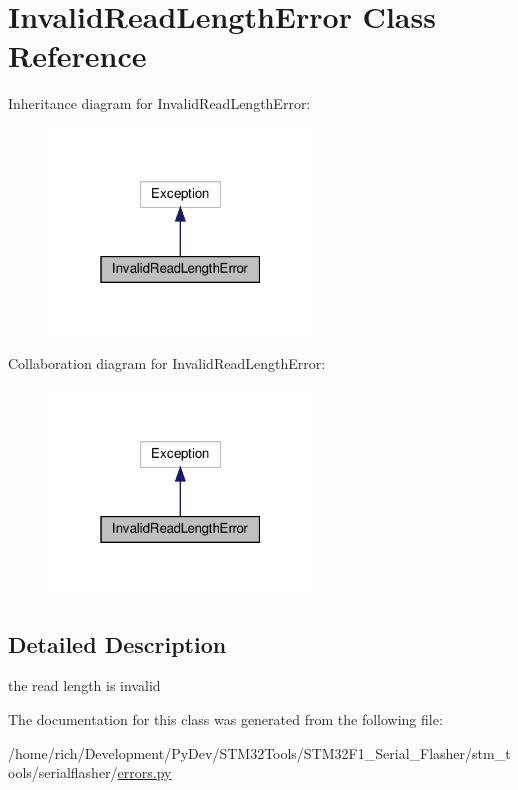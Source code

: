 \hypertarget{classstm__tools_1_1serialflasher_1_1errors_1_1InvalidReadLengthError}{}\section{Invalid\+Read\+Length\+Error Class Reference}
\label{classstm__tools_1_1serialflasher_1_1errors_1_1InvalidReadLengthError}


Inheritance diagram for Invalid\+Read\+Length\+Error\+:
\nopagebreak
\begin{figure}[H]
\begin{center}
\leavevmode
\includegraphics[width=199pt]{classstm__tools_1_1serialflasher_1_1errors_1_1InvalidReadLengthError__inherit__graph}
\end{center}
\end{figure}


Collaboration diagram for Invalid\+Read\+Length\+Error\+:
\nopagebreak
\begin{figure}[H]
\begin{center}
\leavevmode
\includegraphics[width=199pt]{classstm__tools_1_1serialflasher_1_1errors_1_1InvalidReadLengthError__coll__graph}
\end{center}
\end{figure}


\subsection{Detailed Description}
\begin{DoxyVerb}the read length is invalid\end{DoxyVerb}
 

The documentation for this class was generated from the following file\+:\begin{DoxyCompactItemize}
\item 
/home/rich/\+Development/\+Py\+Dev/\+S\+T\+M32\+Tools/\+S\+T\+M32\+F1\+\_\+\+Serial\+\_\+\+Flasher/stm\+\_\+tools/serialflasher/\hyperlink{errors_8py}{errors.\+py}\end{DoxyCompactItemize}
